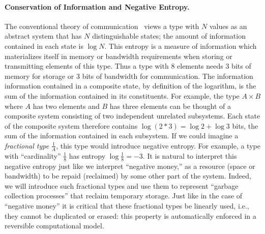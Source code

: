 \documentclass[sigplan,10pt,review,anonymous]{acmart}
\begin{document}
\paragraph*{Conservation of Information and Negative Entropy.}  
The conventional theory of
communication~\cite{Shannon1948} views a type with $N$ values as
an abstract system that has $N$ distinguishable states; the
amount of information contained in each state is $\log{N}$. This
entropy is a measure of information which materializes itself in
memory or bandwidth requirements when storing or transmitting elements
of this type. Thus a type with 8 elements needs 3 bits of memory for
storage or 3 bits of bandwidth for communication. The information
information contained in a composite state, by definition of the
logarithm, is the sum of
the information contained in its constituents. For example, the type
$A \times B$ where $A$ has two elements and $B$ has three elements can
be thought of a composite system consisting of two independent
unrelated subsystems.  Each state of the composite system therefore
contains $\log{(2*3)} = \log{2} + \log{3}$ bits, the sum of
the information contained in each subsystem. If we could imagine a
\emph{fractional type} $\frac{1}{A}$, this type would introduce
negative entropy. For example, a type with ``cardinality''
$\frac{1}{8}$ has entropy $\log{\frac{1}{8}} = -3$. It is natural to
interpret this negative entropy just like we interpret ``negative
money,'' as a resource (space or bandwidth) to be repaid (reclaimed)
by some other part of the system. Indeed, we will introduce such
fractional types and use them to represent ``garbage collection
processes'' that reclaim temporary storage. Just like in the case of
``negative money'' it is critical that these fractional types be
linearly used, i.e., they cannot be duplicated or erased: this
property is automatically enforced in a reversible
computational model.
\end{document}

